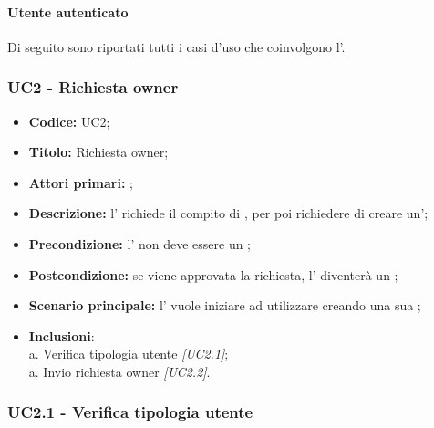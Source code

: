 \documentclass[casi-duso]{subfiles}
\begin{document}


\paragraph{Utente autenticato}
\label{par:utente-autenticato}
Di seguito sono riportati tutti i casi d'uso che coinvolgono l'.

\subsubsection{UC2 - Richiesta owner}
\label{subsub:UC2}

\begin{itemize}
  \item \textbf{Codice:} UC2;
  \item \textbf{Titolo:} Richiesta owner;
  \item \textbf{Attori primari:} ;
  \item \textbf{Descrizione:} l' richiede il compito di , per poi richiedere di creare un';
  \item \textbf{Precondizione:} l' non deve essere un ;
  \item \textbf{Postcondizione:} se viene approvata la richiesta, l' diventerà un ;
  \item \textbf{Scenario principale:} l' vuole iniziare ad utilizzare  creando una sua ;
  \item \textbf{Inclusioni}:
        \\a. Verifica tipologia utente \emph{[UC2.1]};
        \\a. Invio richiesta owner \emph{[UC2.2]}.


\end{itemize}


\subsubsection{UC2.1 - Verifica tipologia utente}
\label{subsub:UC2.1}
\end{document}
